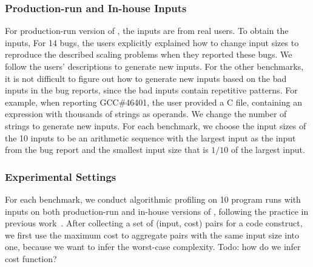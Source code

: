 \subsubsection{Production-run and In-house Inputs}


For production-run version of \Tool, the inputs
are from real users. To obtain the inputs, 
For 14 bugs, 
the users explicitly explained how to change input sizes 
to reproduce the described scaling problems 
when they reported these bugs. 
We follow the users' descriptions to generate new inputs. 
For the other benchmarks, it is not difficult to figure out 
how to generate new inputs based on the bad inputs in the bug reports,
since the bad inputs contain repetitive patterns. 
For example, when reporting GCC\#46401,
 the user provided a C file, 
containing an expression with thousands of strings as operands. 
We change the number of strings to generate new inputs. 
For each benchmark, we choose the input sizes of the 10 inputs 
to be an arithmetic sequence with the largest input 
as the input from the bug report and the 
smallest input size that is $1/10$ 
of the largest input.


\subsubsection{Experimental Settings}

For each benchmark, we conduct algorithmic profiling on 10 program 
runs with inputs on both production-run and in-house versions
of \Tool, following the practice 
in previous work~\cite{joy.asplos13,SongOOPSLA2014}.
%
After collecting a set of (input, cost) pairs for a code construct, 
we first use the maximum cost to aggregate pairs with the same input size into one,
because we want to infer the worst-case complexity.
{\color{red} Todo: how do we infer cost function?}









